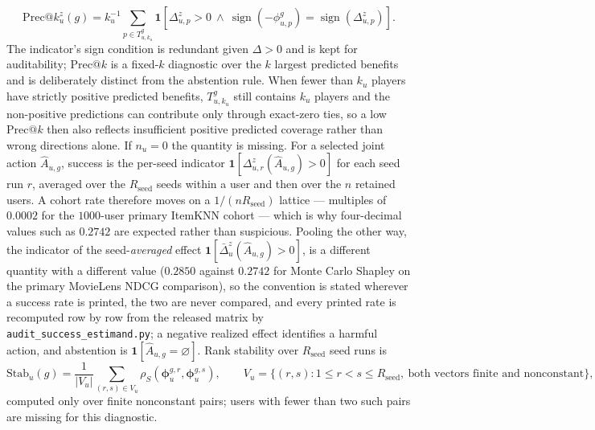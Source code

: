 \documentclass[manuscript,screen,review,anonymous]{acmart}
\begin{document}
\begin{equation}
\mathrm{Prec}@k_u^z(g)=k_u^{-1}\sum_{p\in T_{u,k_u}^g}\mathbf{1}\left[\Delta_{u,p}^z>0\ \wedge\ \operatorname{sign}(-\phi^g_{u,p})=\operatorname{sign}(\Delta_{u,p}^z)\right].
\end{equation}
The indicator's sign condition is redundant given $\Delta>0$ and is kept for auditability; $\mathrm{Prec}@k$ is a fixed-$k$ diagnostic over the $k$ largest predicted benefits and is deliberately distinct from the abstention rule. When fewer than $k_u$ players have strictly positive predicted benefits, $T_{u,k_u}^g$ still contains $k_u$ players and the non-positive predictions can contribute only through exact-zero ties, so a low $\mathrm{Prec}@k$ then also reflects insufficient positive predicted coverage rather than wrong directions alone. If $n_u=0$ the quantity is missing. For a selected joint action $\widehat A_{u,g}$, success is the per-seed indicator $\mathbf{1}[\Delta_{u,r}^z(\widehat A_{u,g})>0]$ for each seed run $r$, averaged over the $R_{\mathrm{seed}}$ seeds within a user and then over the $n$ retained users. A cohort rate therefore moves on a $1/(nR_{\mathrm{seed}})$ lattice --- multiples of $0.0002$ for the $1000$-user primary ItemKNN cohort --- which is why four-decimal values such as $0.2742$ are expected rather than suspicious. Pooling the other way, the indicator of the seed-\emph{averaged} effect $\mathbf{1}[\bar\Delta_u^z(\widehat A_{u,g})>0]$, is a different quantity with a different value ($0.2850$ against $0.2742$ for Monte Carlo Shapley on the primary MovieLens NDCG comparison), so the convention is stated wherever a success rate is printed, the two are never compared, and every printed rate is recomputed row by row from the released matrix by \texttt{audit\_success\_estimand.py}; a negative realized effect identifies a harmful action, and abstention is $\mathbf{1}[\widehat A_{u,g}=\varnothing]$. Rank stability over $R_{\mathrm{seed}}$ seed runs is
\begin{equation}
\mathrm{Stab}_u(g)=\frac{1}{|V_u|}\sum_{(r,s)\in V_u}\rho_S(\boldsymbol\phi_{u}^{g,r},\boldsymbol\phi_{u}^{g,s}),\qquad V_u=\{(r,s):1\le r<s\le R_{\mathrm{seed}},\ \text{both vectors finite and nonconstant}\},
\end{equation}
computed only over finite nonconstant pairs; users with fewer than two such pairs are missing for this diagnostic.
\end{document}
